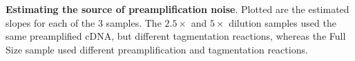 \label{fig:noisesource} \textbf{Estimating the source of preamplification noise}.  Plotted are the estimated slopes for each of the 3 samples.  The $2.5\times$ and $5\times$ dilution samples used the same preamplified cDNA, but different tagmentation reactions, whereas the Full Size sample used different preamplification and tagmentation reactions.